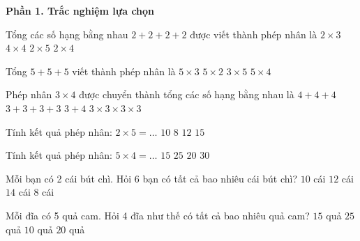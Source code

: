 \textbf{Phần 1. Trắc nghiệm lựa chọn}

\begin{ex} %
Tổng các số hạng bằng nhau $2 + 2 + 2 + 2$ được viết thành phép nhân là
\choice
{$2 \times 3$}
{$4 \times 4$}
{$2 \times 5$}
{\True $2 \times 4$}
\end{ex}

\begin{ex} %
Tổng $5 + 5 + 5$ viết thành phép nhân là
\choice
{\True $5 \times 3$}
{$5 \times 2$}
{$3 \times 5$}
{$5 \times 4$}
\end{ex}

\begin{ex} %
Phép nhân $3 \times 4$ được chuyển thành tổng các số hạng bằng nhau là
\choice
{$4 + 4 + 4$}
{\True $3 + 3 + 3 + 3$}
{$3 + 4$}
{$3 \times 3 \times 3 \times 3$}
\end{ex}

\begin{ex} %
Tính kết quả phép nhân: $2 \times 5 = \dots$
\choice
{\True $10$}
{$8$}
{$12$}
{$15$}
\end{ex}

\begin{ex} %
Tính kết quả phép nhân: $5 \times 4 = \dots$
\choice
{$15$}
{$25$}
{\True $20$}
{$30$}
\end{ex}

\begin{ex} %
Mỗi bạn có 2 cái bút chì. Hỏi 6 bạn có tất cả bao nhiêu cái bút chì?
\choice
{$10$ cái}
{\True $12$ cái}
{$14$ cái}
{$8$ cái}
\end{ex}

\begin{ex} %
Mỗi đĩa có 5 quả cam. Hỏi 4 đĩa như thế có tất cả bao nhiêu quả cam?
\choice
{$15$ quả}
{$25$ quả}
{$10$ quả}
{\True $20$ quả}
\end{ex}


